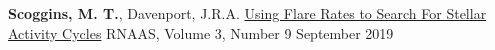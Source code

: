 

\begin{cventries}
\cventry
    {\textbf{Scoggins, M. T.}, Davenport, J.R.A.}
    {\href{https://iopscience.iop.org/article/10.3847/2515-5172/ab45a0}{Using Flare Rates to Search For Stellar Activity Cycles}}
    {RNAAS, Volume 3, Number 9}
    {September 2019}{}{}
    \vspace{-0.6cm}


\end{cventries}